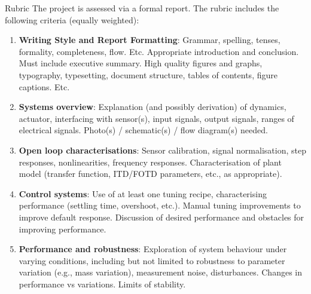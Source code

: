 \documentclass[9pt]{beamer-control}
\begin{document}
\begin{frame}{Rubric}
The project is assessed via a formal report. The rubric includes the following criteria (equally weighted):

\small
\begin{enumerate}
    \item \textbf{Writing Style and Report Formatting}:
    Grammar, spelling, tenses, formality, completeness, flow. Etc. Appropriate introduction and conclusion. Must include executive summary. High quality figures and graphs, typography, typesetting, document structure, tables of contents, figure captions. Etc.

    \item \textbf{Systems overview}:
    Explanation (and possibly derivation) of dynamics, actuator, interfacing with sensor(s), input signals, output signals, ranges of electrical signals. Photo(s) / schematic(s) / flow diagram(s) needed.

    \item \textbf{Open loop characterisations}:
    Sensor calibration, signal normalisation, step responses, nonlinearities, frequency responses. Characterisation of plant model (transfer function, ITD/FOTD parameters, etc., as appropriate).

    \item \textbf{Control systems}:
    Use of at least one tuning recipe, characterising performance (settling time, overshoot, etc.). Manual tuning improvements to improve default response. Discussion of desired performance and obstacles for improving performance.

    \item \textbf{Performance and robustness}:
    Exploration of system behaviour under varying conditions, including but not limited to robustness to parameter variation (e.g., mass variation), measurement noise, disturbances. Changes in performance vs variations. Limits of stability.
\end{enumerate}
\end{frame}

\SUMMARYFRAME
\end{document}
